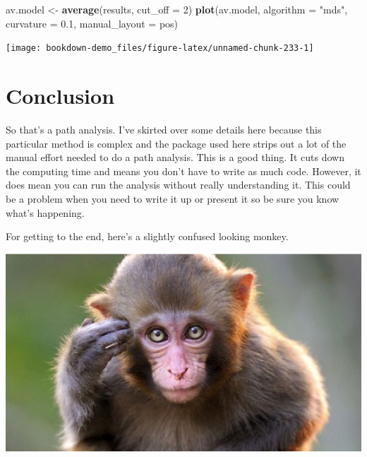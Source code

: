 \documentclass[
]{book}
\newenvironment{Shaded}{\begin{snugshade}}{\end{snugshade}}
\newcommand{\DataTypeTok}[1]{\textcolor[rgb]{0.13,0.29,0.53}{#1}}
\newcommand{\DecValTok}[1]{\textcolor[rgb]{0.00,0.00,0.81}{#1}}
\newcommand{\FloatTok}[1]{\textcolor[rgb]{0.00,0.00,0.81}{#1}}
\newcommand{\KeywordTok}[1]{\textcolor[rgb]{0.13,0.29,0.53}{\textbf{#1}}}
\newcommand{\NormalTok}[1]{#1}
\newcommand{\StringTok}[1]{\textcolor[rgb]{0.31,0.60,0.02}{#1}}
\begin{document}
\begin{Shaded}
\begin{Highlighting}[]
\NormalTok{av.model \textless{}{-}}\StringTok{ }\KeywordTok{average}\NormalTok{(results, }\DataTypeTok{cut\_off =} \DecValTok{2}\NormalTok{)}
\KeywordTok{plot}\NormalTok{(av.model, }\DataTypeTok{algorithm =} \StringTok{"mds"}\NormalTok{, }\DataTypeTok{curvature =} \FloatTok{0.1}\NormalTok{, }\DataTypeTok{manual\_layout =}\NormalTok{ pos)}
\end{Highlighting}
\end{Shaded}

\begin{center}\texttt{[image: bookdown-demo\_files/figure-latex/unnamed-chunk-233-1]} \end{center}

\hypertarget{conclusion-1}{%
\section{Conclusion}\label{conclusion-1}}

So that's a path analysis. I've skirted over some details here because this particular method is complex and the package used here strips out a lot of the manual effort needed to do a path analysis. This is a good thing. It cuts down the computing time and means you don't have to write as much code. However, it does mean you can run the analysis without really understanding it. This could be a problem when you need to write it up or present it so be sure you know what's happening.

For getting to the end, here's a slightly confused looking monkey.

\begin{center}\includegraphics[width=10.1in]{Images/monkey} \end{center}
\end{document}
